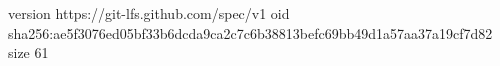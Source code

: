 version https://git-lfs.github.com/spec/v1
oid sha256:ae5f3076ed05bf33b6dcda9ca2c7c6b38813befc69bb49d1a57aa37a19cf7d82
size 61
